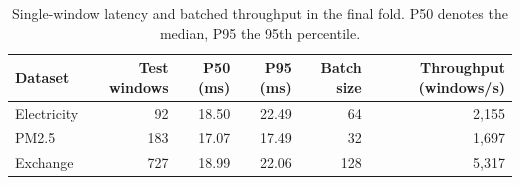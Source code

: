 \documentclass[10pt,a4paper]{article}
\begin{document}
\begin{table}[H]
\centering
\caption{Single-window latency and batched throughput in the final fold. P50 denotes the median, P95 the 95th percentile.}\label{tab:4}
\small
\begin{tabular}{@{}lrrrrr@{}}
\toprule
\textbf{Dataset} & \textbf{Test windows} & \textbf{P50 (ms)} & \textbf{P95 (ms)} & \textbf{Batch size} & \textbf{Throughput (windows/s)} \\
\midrule
Electricity & 92 & 18.50 & 22.49 & 64 & 2,155 \\
PM2.5 & 183 & 17.07 & 17.49 & 32 & 1,697 \\
Exchange & 727 & 18.99 & 22.06 & 128 & 5,317 \\
\bottomrule
\end{tabular}
\end{table}
\end{document}
